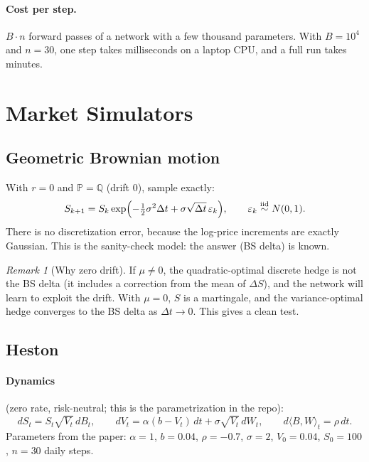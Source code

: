 \documentclass[11pt]{article}
\theoremstyle{definition}
\theoremstyle{remark}
\newtheorem{remark}[theorem]{Remark}
\begin{document}
\paragraph{Cost per step.} $B\cdot n$ forward passes of a network with a few thousand parameters. With
$B=10^4$ and $n=30$, one step takes milliseconds on a laptop CPU, and a full run takes minutes.

\section{Market Simulators}\label{sec:sim}

\subsection{Geometric Brownian motion}

With $r=0$ and $\mathbb P=\mathbb Q$ (drift $0$), sample exactly:
\[
S_{k+1}=S_k\exp\Bigl(-\tfrac12\sigma^2\Delta t+\sigma\sqrt{\Delta t}\,\varepsilon_k\Bigr),\qquad \varepsilon_k\overset{\text{iid}}{\sim}N(0,1).
\]
There is no discretization error, because the log-price increments are exactly Gaussian.
This is the sanity-check model: the answer (BS delta) is known.

\begin{remark}[Why zero drift]
If $\mu\neq0$, the quadratic-optimal discrete hedge is not the BS delta (it includes a correction from the mean of
$\Delta S$), and the network will learn to exploit the drift. With $\mu=0$, $S$ is a martingale, and the
variance-optimal hedge converges to the BS delta as $\Delta t\to0$. This gives a clean test.
\end{remark}

\subsection{Heston}

\paragraph{Dynamics} (zero rate, risk-neutral; this is the parametrization in the repo):
\[
dS_t=S_t\sqrt{V_t}\,dB_t,\qquad dV_t=\alpha(b-V_t)\,dt+\sigma\sqrt{V_t}\,dW_t,\qquad d\langle B,W\rangle_t=\rho\,dt.
\]
Parameters from the paper: $\alpha=1$, $b=0.04$, $\rho=-0.7$, $\sigma=2$, $V_0=0.04$, $S_0=100$,
$n=30$ daily steps.
\end{document}
